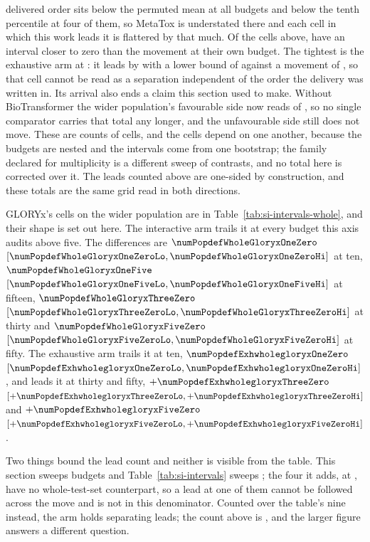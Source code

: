 \documentclass[journal=jcisd8,manuscript=suppinfo,layout=onecolumn]{achemso}
\begin{document}
delivered order sits below the permuted mean at all \numPopdefTiebreakwiderbudgetsWord{} budgets
and below the tenth percentile at four of them, so MetaTox is understated there and each cell in
which this work leads it is flattered by that much. Of the cells above,
\numPopdefTiebreakcellsinreachWord{} have an interval closer to zero than the movement at their own
budget. The tightest is the
exhaustive arm at \numPopdefTiebreakworstbudget{}: it leads by
\numPopdefTiebreakworstmargin{} with a lower bound of \numPopdefTiebreakworstcilo{} against a
movement of \numPopdefTiebreakworstshift{}, so that cell cannot be read as a separation independent
of the order the delivery was written in. Its arrival also ends a claim this section used to make. Without
BioTransformer the wider population's favourable side now reads \numPopdefWithoutbtforwholeWord{}
of \numPopdefForthisworkwholeWord{}, so no single comparator carries that total any longer, and the
unfavourable side still does not move. These are counts of cells, and the cells depend on one
another, because the budgets are nested and the intervals come from one bootstrap; the family
declared for multiplicity is a different sweep of \numHolmTests{} contrasts, and no total here is
corrected over it. The \numPopdefLeadstotalWord{} leads counted above are one-sided by
construction, and these totals are the same grid read in both directions.

GLORYx's cells on the wider population are in Table~\ref{tab:si-intervals-whole}, and their shape is set out here.
The interactive arm trails it at every budget this axis audits above five. The differences are
$\numPopdefWholeGloryxOneZero$ $[\numPopdefWholeGloryxOneZeroLo,
\numPopdefWholeGloryxOneZeroHi]$ at ten, $\numPopdefWholeGloryxOneFive$
$[\numPopdefWholeGloryxOneFiveLo, \numPopdefWholeGloryxOneFiveHi]$ at fifteen,
$\numPopdefWholeGloryxThreeZero$ $[\numPopdefWholeGloryxThreeZeroLo,
\numPopdefWholeGloryxThreeZeroHi]$ at thirty and $\numPopdefWholeGloryxFiveZero$
$[\numPopdefWholeGloryxFiveZeroLo, \numPopdefWholeGloryxFiveZeroHi]$ at fifty. The exhaustive arm
trails it at ten, $\numPopdefExhwholegloryxOneZero$ $[\numPopdefExhwholegloryxOneZeroLo,
\numPopdefExhwholegloryxOneZeroHi]$, and leads it at thirty and fifty,
$+\numPopdefExhwholegloryxThreeZero$ $[+\numPopdefExhwholegloryxThreeZeroLo,
+\numPopdefExhwholegloryxThreeZeroHi]$ and $+\numPopdefExhwholegloryxFiveZero$
$[+\numPopdefExhwholegloryxFiveZeroLo, +\numPopdefExhwholegloryxFiveZeroHi]$.

Two things bound the lead count and neither is visible from the table. This section sweeps
\numSTwoNineBudgets{} budgets and Table~\ref{tab:si-intervals} sweeps
\numSTwoNineTablebudgets{}; the four it adds, at \numSTwoNineBudgetsunaudited{}, have no
whole-test-set counterpart, so a lead at one of them cannot be followed across the move and is not
in this denominator. Counted over the table's nine instead, the arm holds \numSTwoNineLeads{}
separating leads; the count above is \numPopdefLeadstotal{}, and the larger figure answers a
different question.
\end{document}
